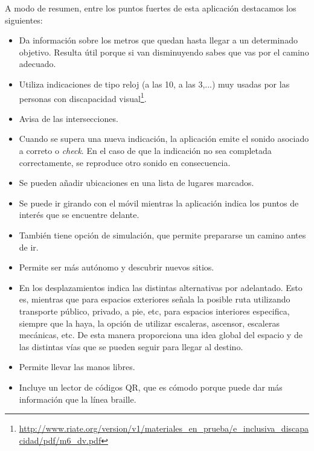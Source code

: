 A modo de resumen, entre los puntos fuertes de esta aplicación destacamos los siguientes:
\begin{itemize}
	\item Da información sobre los metros que quedan hasta llegar a un determinado objetivo. Resulta útil porque si van disminuyendo sabes que vas por el camino adecuado.
	
	\item Utiliza indicaciones de tipo reloj (a las 10, a las 3,...) muy usadas por las personas con discapacidad visual\footnote{\url{http://www.riate.org/version/v1/materiales_en_prueba/e_inclusiva_discapacidad/pdf/m6_dv.pdf}}.
	
	\item Avisa de las intersecciones. 
	
	\item Cuando se supera una nueva indicación, la aplicación emite el sonido asociado a correto o \textit{check}. En el caso de que la indicación no sea completada correctamente, se reproduce otro sonido en consecuencia.
	
	\item Se pueden añadir ubicaciones en una lista de lugares marcados.
	
	\item Se puede ir girando con el móvil mientras la aplicación indica los puntos de interés que se encuentre delante. 
	
	\item También tiene opción de simulación, que permite prepararse un camino antes de ir.
	
	\item Permite ser más autónomo y descubrir nuevos sitios.
	
	\item En los desplazamientos indica las distintas alternativas por adelantado. Esto es, mientras que para espacios exteriores señala la posible ruta utilizando transporte público, privado, a pie, etc, para espacios interiores especifica, siempre que la haya, la opción de utilizar escaleras, ascensor, escaleras mecánicas, etc. De esta manera proporciona una idea global del espacio y de las distintas vías que se pueden seguir para llegar al destino.
	
	\item Permite llevar las manos libres.
	
	\item Incluye un lector de códigos QR, que es cómodo porque puede dar más información que la línea braille.
\end{itemize}

